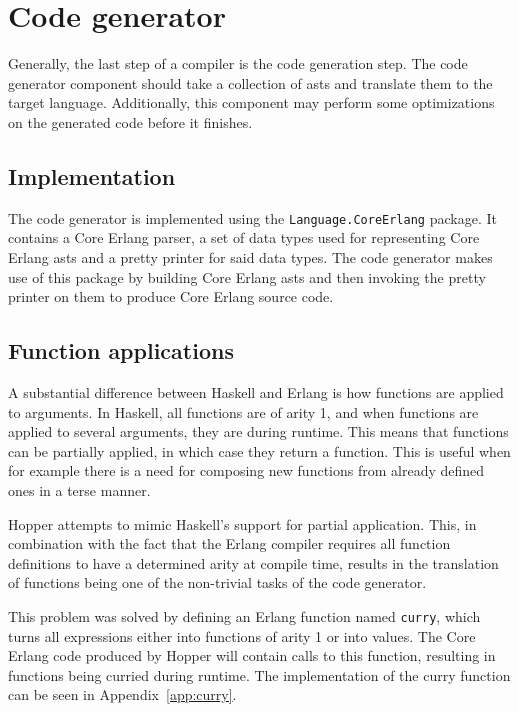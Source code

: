 \section{Code generator}

Generally, the last step of a compiler is the code generation step. The code generator
component should take a collection of \glspl{ast} and translate them to the target language. Additionally, this component may perform some optimizations on the generated code before it finishes.

\subsection{Implementation}

The code generator is implemented using the \texttt{Language.CoreErlang}\cite{CoreErlang} package. It contains a Core Erlang parser, a set of data types used for representing Core Erlang \glspl{ast} and a pretty printer for said data types. The code generator makes use of this package by building Core Erlang \glspl{ast} and then invoking the pretty printer on them to produce Core Erlang source code.

\subsection{Function applications}

A substantial difference between Haskell and Erlang is how functions are applied to arguments. In Haskell, all functions are of \gls{arity} 1, and when functions are applied to several arguments, they are  during runtime. This means that functions can be partially applied, in which case they return a function. This is useful when for example there is a need for composing new functions from already defined ones in a terse manner.

Hopper attempts to mimic Haskell's support for partial application. This, in combination with the fact that the Erlang compiler requires all function definitions to have a determined \gls{arity} at compile time, results in the translation of functions being one of the non-trivial tasks of the code generator.

This problem was solved by defining an Erlang function named \texttt{curry}, which turns all expressions either into functions of \gls{arity} 1 or into values. The Core Erlang code produced by Hopper will contain calls to this function, resulting in functions being curried during runtime. The implementation of the curry function can be seen in Appendix~\ref{app:curry}.

